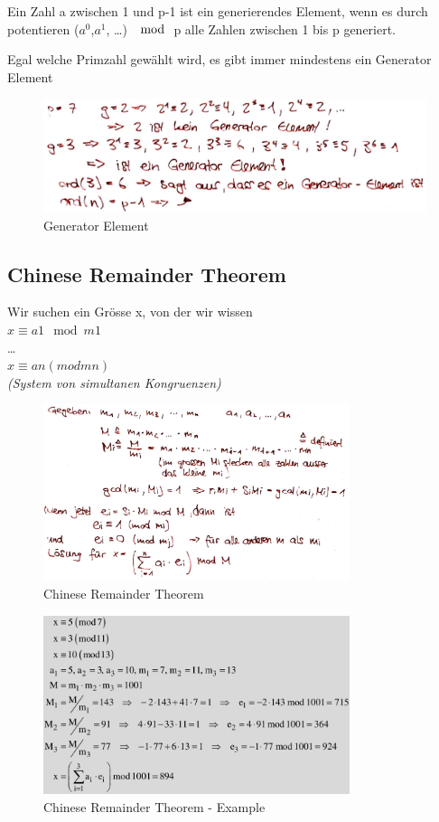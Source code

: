Ein Zahl a zwischen 1 und p-1 ist ein generierendes Element, wenn es durch
potentieren ($a^0$,$a^1$, \ldots{}) $\mod$ p alle Zahlen zwischen 1 bis
p generiert.

\begin{tcolorbox}[colback=red!5!white,colframe=red!75!black]
Egal welche Primzahl gewählt wird, es gibt immer mindestens ein Generator Element
\end{tcolorbox}

\begin{figure}[H]
\centering
\includegraphics[width=1\textwidth]{figures/generatorElementExample.png}
\caption{Generator Element}
\end{figure}

\clearpage
\hypertarget{chinese-remainder-theorem}{%
\subsection{Chinese Remainder Theorem}\label{chinese-remainder-theorem}}

Wir suchen ein Grösse x, von der wir wissen\\
$x \equiv a1 \mod m1$\\
\ldots{}\\
$x \equiv an (mod mn)$\\
\emph{(System von simultanen Kongruenzen)}

\begin{figure}[H]
\centering
\includegraphics[width=0.8\textwidth]{figures/chinesischerRestsatz.png}
\caption{Chinese Remainder Theorem}
\end{figure}

\begin{figure}[H]
\centering
\includegraphics[width=0.8\textwidth]{figures/chinesischerRestsatzExample.png}
\caption{Chinese Remainder Theorem - Example}
\end{figure}

\clearpage

